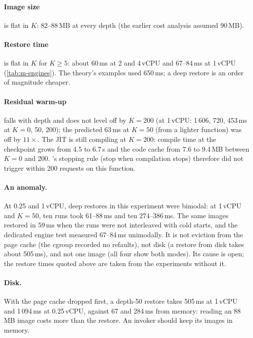 \paragraph{Image size} is flat in $K$: 82--88\,MB at every depth (the earlier cost analysis
assumed 90\,MB). \paragraph{Restore time} is flat in $K$ for $K \ge 5$: about 60\,ms at 2 and 4\,vCPU
and 67--84\,ms at 1\,vCPU (\cref{tab:m-engines}). The theory's examples used 650\,ms; a deep
restore is an order of magnitude cheaper. \paragraph{Residual warm-up} falls with depth and does
not level off by $K = 200$ (at 1\,vCPU: 1\,606, 720, 453\,ms at $K = 0$, 50, 200); the predicted
63\,ms at $K = 50$ (from a lighter function) was off by $11\times$. The JIT is still compiling at
$K = 200$: compile time at the checkpoint grows from 4.5 to 6.7\,s and the code cache from 7.6 to
9.4\,MB between $K = 0$ and 200. 's stopping rule (stop when compilation stops)
therefore did not trigger within 200 requests on this function.

\paragraph{An anomaly.} At 0.25 and 1\,vCPU, deep restores in this experiment were bimodal: at
1\,vCPU and $K = 50$, ten runs took 61--88\,ms and ten 274--386\,ms. The same images restored in
59\,ms when the runs were not interleaved with cold starts, and the dedicated engine test measured
67--84\,ms unimodally. It is not eviction from the page cache (the cgroup recorded no refaults), not
disk (a restore from disk takes about 505\,ms), and not one image (all four show both modes). Its
cause is open; the restore times quoted above are taken from the experiments without it.

\paragraph{Disk.} With the page cache dropped first, a depth-50 restore takes 505\,ms at 1\,vCPU and
1\,094\,ms at 0.25\,vCPU, against 67 and 284\,ms from memory: reading an 88\,MB image costs more
than the restore. An invoker should keep its images in memory.

